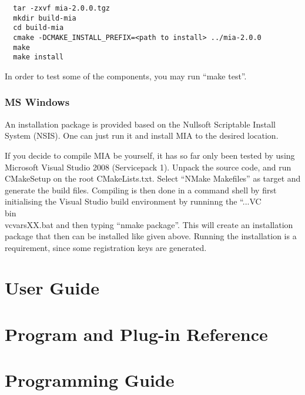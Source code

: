 \documentclass[english, 10pt, a4paper,headsepline,openany]{scrbook}
\begin{document}
\lstset{language=bash}
\begin{lstlisting}
  tar -zxvf mia-2.0.0.tgz
  mkdir build-mia
  cd build-mia
  cmake -DCMAKE_INSTALL_PREFIX=<path to install> ../mia-2.0.0
  make
  make install
\end{lstlisting}
In order to test some of the components, you may run ``make test''. 

\subsection{MS Windows} 

An installation package is provided based on the Nullsoft Scriptable Install System (NSIS). 
One can just run it and install MIA to the desired location. 

If you decide to compile MIA be yourself, it has so far only been tested by using Microsoft Visual Studio 2008 (Servicepack 1). 
Unpack the source code, and run CMakeSetup on the root CMakeLists.txt. 
Select ``NMake Makefiles'' as target and generate the build files. 
Compiling is then done in a command shell by first initialising the Visual Studio build environment by runninng  the 
  ``...VC\\bin\\vcvarsXX.bat and then typing ``nmake package''. 
This will create an installation package that then can be installed like given above.
Running the installation is a requirement, since some registration keys are generated. 

\chapter{User Guide}





\chapter{Program and Plug-in Reference}



\chapter{Programming Guide}
\lstset{numbers=left, numberstyle=\small, numbersep=5pt}
\end{document}
